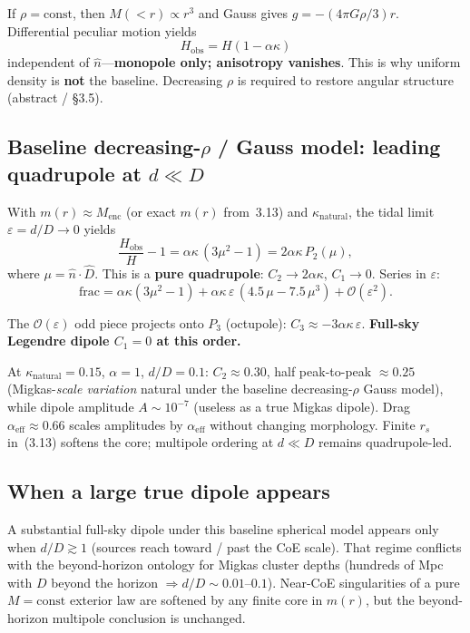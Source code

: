 \documentclass[11pt,a4paper]{article}
\begin{document}
If \(\rho=\mathrm{const}\), then \(M(<r)\propto r^3\) and Gauss gives \(g=-(4\pi G\rho/3)r\). Differential peculiar motion yields
\[
H_{\mathrm{obs}}=H(1-\alpha\kappa)
\]
independent of \(\hat{n}\)---\textbf{monopole only; anisotropy vanishes}. This is why uniform density is \textbf{not} the baseline. Decreasing \(\rho\) is required to restore angular structure (abstract / \S3.5).

\subsection{Baseline decreasing-\(\rho\) / Gauss model: leading quadrupole at \(d\ll D\)}

With \(m(r)\approx M_{\mathrm{enc}}\) (or exact \(m(r)\) from~3.13) and \(\kappa_{\mathrm{natural}}\), the tidal limit \(\varepsilon=d/D\to 0\) yields
\[
\frac{H_{\mathrm{obs}}}{H}-1=\alpha\kappa\,(3\mu^2-1)=2\alpha\kappa\,P_2(\mu),
\]
where \(\mu=\hat{n}\cdot\hat{D}\). This is a \textbf{pure quadrupole}: \(C_2\to 2\alpha\kappa\), \(C_1\to 0\). Series in \(\varepsilon\):
\[
\mathrm{frac}=\alpha\kappa(3\mu^2-1)+\alpha\kappa\,\varepsilon\,(4.5\,\mu-7.5\,\mu^3)+\mathcal{O}(\varepsilon^2).
\]

The \(\mathcal{O}(\varepsilon)\) odd piece projects onto \(P_3\) (octupole): \(C_3\approx -3\alpha\kappa\,\varepsilon\). \textbf{Full-sky Legendre dipole \(C_1=0\) at this order.}

At \(\kappa_{\mathrm{natural}}=0.15\), \(\alpha=1\), \(d/D=0.1\): \(C_2\approx 0.30\), half peak-to-peak \(\approx 0.25\) (Migkas-\emph{scale variation} natural under the baseline decreasing-\(\rho\) Gauss model), while dipole amplitude \(A\sim 10^{-7}\) (useless as a true Migkas dipole). Drag \(\alpha_{\mathrm{eff}}\approx 0.66\) scales amplitudes by \(\alpha_{\mathrm{eff}}\) without changing morphology. Finite \(r_s\) in~(3.13) softens the core; multipole ordering at \(d\ll D\) remains quadrupole-led.

\subsection{When a large true dipole appears}

A substantial full-sky dipole under this baseline spherical model appears only when \(d/D\gtrsim 1\) (sources reach toward / past the CoE scale). That regime conflicts with the beyond-horizon ontology for Migkas cluster depths (hundreds of Mpc with \(D\) beyond the horizon \(\Rightarrow d/D\sim 0.01\)--\(0.1\)). Near-CoE singularities of a pure \(M=\mathrm{const}\) exterior law are softened by any finite core in \(m(r)\), but the beyond-horizon multipole conclusion is unchanged.
\end{document}
